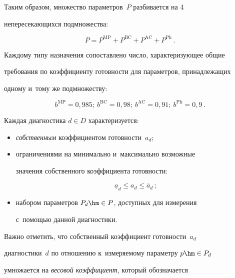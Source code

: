 Таким образом, множество параметров~$P$ разбивается на 4 


непересекающихся подмножества:


$$


P=P^{\mathrm{MP}}+P^{\mathrm{BC}}+P^{\mathrm{AC}} 


+P^{\mathrm{Ph}}\,.$$





Каждому типу назначения сопоставлено число, характеризующее общие 


требования по коэффициенту готовности для па\-ра\-мет\-ров, принадлежащих 


одному и~тому же подмножеству:


$$


b^{\mathrm{MP}} =0{,}985;\ b^{\mathrm{BC}} =0{,}98;\ b^{\mathrm{AC}} 


=0{,}91;\ b^{\mathrm{Ph}}=0{,}9\,.


$$





Каждая диагностика $d\in D$ характеризуется:


\begin{itemize}


\item \textit{собственным} коэффициентом готовности~$a_d$;


\item ограничениями на минимально и~максимально возможные 


значения собственного коэффициента готовности: 


\begin{equation}


\underline{a}_d\leq a_d\leq \overline{a}_d\,;


\label{e2-kn}


\end{equation}


\item набором параметров $P_d\hm\in P$, до\-ступ\-ных для измерения 


с~по\-мощью данной диагностики.


\end{itemize}


Важно отметить, что собственный коэффициент го\-тов\-ности~$a_d$ 


диагностики~$d$ по отношению к~из\-ме\-ря\-емо\-му па\-ра\-мет\-ру $p\hm\in P_d$ 


умножается на \textit{весовой коэффициент}, который обозначается 


